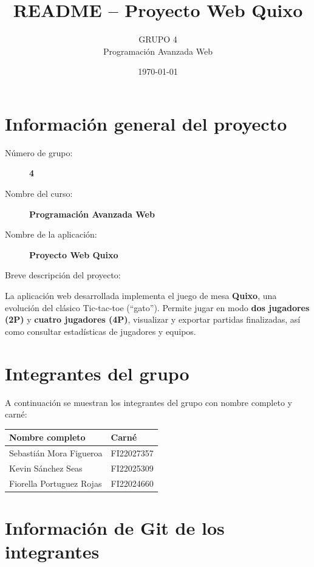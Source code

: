 \documentclass[11pt,a4paper]{article}
\title{README -- Proyecto Web Quixo}
\author{GRUPO 4 \\ Programación Avanzada Web}
\date{\today}
\begin{document}
\maketitle

\section{Información general del proyecto}

\begin{description}
    \item[Número de grupo:] \textbf{4}
    \item[Nombre del curso:] \textbf{Programación Avanzada Web}
    \item[Nombre de la aplicación:] \textbf{Proyecto Web Quixo}
\end{description}

Breve descripción del proyecto:

\medskip

La aplicación web desarrollada implementa el juego de mesa \textbf{Quixo}, una evolución del clásico Tic-tac-toe (``gato''). 
Permite jugar en modo \textbf{dos jugadores (2P)} y \textbf{cuatro jugadores (4P)}, visualizar y exportar partidas finalizadas,
así como consultar estadísticas de jugadores y equipos.

\section{Integrantes del grupo}

A continuación se muestran los integrantes del grupo con nombre completo y carné:

\begin{longtable}{|l|l|}
\hline
\textbf{Nombre completo}      & \textbf{Carné} \\
\hline
Sebastián Mora Figueroa        & FI22027357 \\ \hline
Kevin Sánchez Seas             & FI22025309 \\ \hline
Fiorella Portuguez Rojas       & FI22024660 \\ \hline
\end{longtable}

\section{Información de Git de los integrantes}
\end{document}
